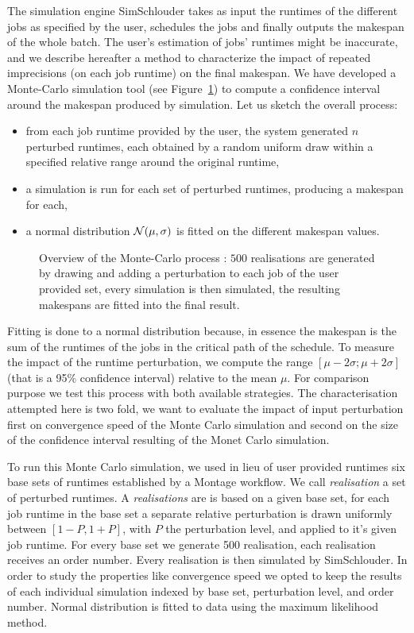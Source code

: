\documentclass[10pt,conference,compsocconf]{IEEEtran}
\begin{document}
The simulation engine SimSchlouder takes as input the runtimes of the different
jobs  as specified  by the  user,  schedules the  jobs and  finally outputs  the
makespan of  the whole batch. The  user's estimation of jobs'  runtimes might be
inaccurate, and  we describe hereafter  a method  to characterize the  impact of
repeated  imprecisions (on  each job  runtime) on  the final  makespan. We  have
developed a Monte-Carlo  simulation tool (see Figure~\ref{fig:mcprocess})  to compute a
confidence interval  around the makespan  produced by simulation. Let  us sketch
the overall process:
\begin{itemize} 
	\item  from each  job runtime  provided by  the user,  the system
		generated $n$ perturbed runtimes, each obtained by a  random
		uniform draw within a specified relative range around the
		original runtime,
	\item a simulation  is run for each set of  perturbed runtimes,
		producing a makespan for each, 
	\item  a  normal  distribution  ${\cal N}(\mu,\sigma)$  is  fitted  on
		the different  makespan values.
\end{itemize}
\begin{figure}
	\centering
	\resizebox{0.5\textwidth}{!}{%
		
		}
	\caption{Overview of the Monte-Carlo process : $500$ realisations are
	generated by drawing and adding a perturbation to each job of the
	user provided set, every simulation is then simulated, the resulting
	makespans are fitted into the final result. \label{fig:mcprocess}}
\end{figure}
Fitting is done to a normal distribution because, in essence the makespan is
the sum of the runtimes of the jobs in the critical path of the schedule.
To measure the impact of the runtime perturbation, we compute the range
$[\mu-2\sigma;\mu+2\sigma]$ (that is a 95\% confidence interval) relative to the
mean $\mu$. For comparison purpose we test this process with both available
strategies. The characterisation attempted here is two fold, we want
to evaluate the impact of input perturbation first on convergence speed of the
Monte Carlo simulation and second on the size of the confidence interval
resulting of the Monet Carlo simulation.

To run this Monte Carlo simulation, we used in lieu of user provided runtimes
six base sets of runtimes established by a Montage\cite{montage2009} workflow.
We call \emph{realisation} a set of perturbed runtimes. A \emph{realisations}
are is based on a given base set, for each job runtime in the base set a
separate relative perturbation is drawn uniformly between $[1-P,1+P]$, with $P$
the perturbation level, and applied to it's given job runtime. For every base
set we generate 500 realisation, each realisation receives an order number.
Every realisation is then simulated by SimSchlouder. In order to study the
properties like convergence speed we opted to keep the results of each
individual simulation indexed by base set, perturbation level, and order number.
Normal distribution is fitted to data using the maximum likelihood method.
\end{document}
